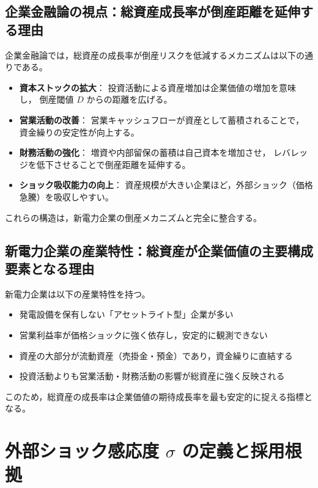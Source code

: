 \subsection{企業金融論の視点：総資産成長率が倒産距離を延伸する理由}

企業金融論では，総資産の成長率が倒産リスクを低減するメカニズムは以下の通りである。

\begin{itemize}
    \item \textbf{資本ストックの拡大}：
          投資活動による資産増加は企業価値の増加を意味し，
          倒産閾値 $D$ からの距離を広げる。
    \item \textbf{営業活動の改善}：
          営業キャッシュフローが資産として蓄積されることで，
          資金繰りの安定性が向上する。
    \item \textbf{財務活動の強化}：
          増資や内部留保の蓄積は自己資本を増加させ，
          レバレッジを低下させることで倒産距離を延伸する。
    \item \textbf{ショック吸収能力の向上}：
          資産規模が大きい企業ほど，外部ショック（価格急騰）を吸収しやすい。
\end{itemize}

これらの構造は，新電力企業の倒産メカニズムと完全に整合する。

\subsection{新電力企業の産業特性：総資産が企業価値の主要構成要素となる理由}

新電力企業は以下の産業特性を持つ。

\begin{itemize}
    \item 発電設備を保有しない「アセットライト型」企業が多い
    \item 営業利益率が価格ショックに強く依存し，安定的に観測できない
    \item 資産の大部分が流動資産（売掛金・預金）であり，資金繰りに直結する
    \item 投資活動よりも営業活動・財務活動の影響が総資産に強く反映される
\end{itemize}

このため，総資産の成長率は企業価値の期待成長率を最も安定的に捉える指標となる。

\section{外部ショック感応度 $\sigma$ の定義と採用根拠}
\label{sec:sigma_theoretical}

